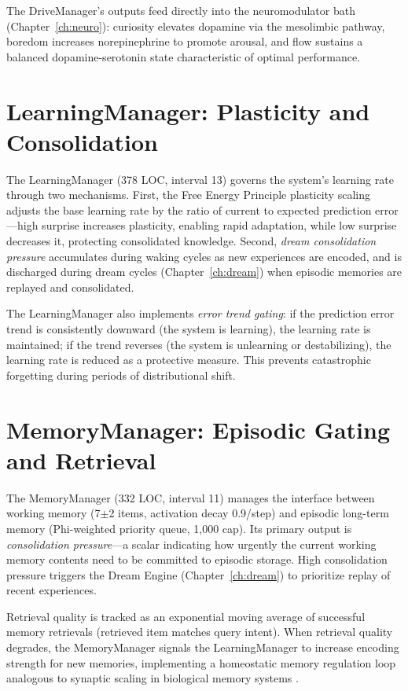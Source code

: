 \documentclass[12pt]{book}
\begin{document}
The DriveManager's outputs feed directly into the neuromodulator bath (Chapter~\ref{ch:neuro}): curiosity elevates dopamine via the mesolimbic pathway, boredom increases norepinephrine to promote arousal, and flow sustains a balanced dopamine-serotonin state characteristic of optimal performance.

\section{LearningManager: Plasticity and Consolidation}

The LearningManager (378 LOC, interval 13) governs the system's learning rate through two mechanisms. First, the Free Energy Principle plasticity scaling adjusts the base learning rate by the ratio of current to expected prediction error---high surprise increases plasticity, enabling rapid adaptation, while low surprise decreases it, protecting consolidated knowledge. Second, \textit{dream consolidation pressure} accumulates during waking cycles as new experiences are encoded, and is discharged during dream cycles (Chapter~\ref{ch:dream}) when episodic memories are replayed and consolidated.

The LearningManager also implements \textit{error trend gating}: if the prediction error trend is consistently downward (the system is learning), the learning rate is maintained; if the trend reverses (the system is unlearning or destabilizing), the learning rate is reduced as a protective measure. This prevents catastrophic forgetting during periods of distributional shift.

\section{MemoryManager: Episodic Gating and Retrieval}

The MemoryManager (332 LOC, interval 11) manages the interface between working memory (7$\pm$2 items, activation decay 0.9/step) and episodic long-term memory (Phi-weighted priority queue, 1,000 cap). Its primary output is \textit{consolidation pressure}---a scalar indicating how urgently the current working memory contents need to be committed to episodic storage. High consolidation pressure triggers the Dream Engine (Chapter~\ref{ch:dream}) to prioritize replay of recent experiences.

Retrieval quality is tracked as an exponential moving average of successful memory retrievals (retrieved item matches query intent). When retrieval quality degrades, the MemoryManager signals the LearningManager to increase encoding strength for new memories, implementing a homeostatic memory regulation loop analogous to synaptic scaling in biological memory systems \citep{squire2004}.
\end{document}
